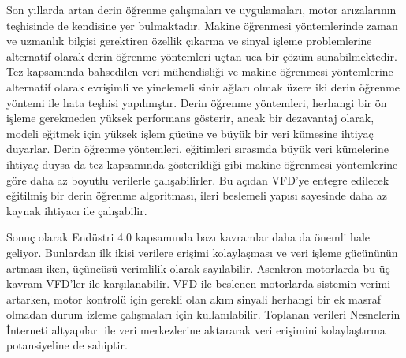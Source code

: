 Son yıllarda artan derin öğrenme çalışmaları ve uygulamaları, motor arızalarının teşhisinde de kendisine yer bulmaktadır. Makine öğrenmesi yöntemlerinde zaman ve uzmanlık bilgisi gerektiren özellik çıkarma ve sinyal işleme problemlerine alternatif olarak derin öğrenme yöntemleri uçtan uca bir çözüm sunabilmektedir. Tez kapsamında bahsedilen veri mühendisliği ve makine öğrenmesi yöntemlerine alternatif olarak evrişimli ve yinelemeli sinir ağları olmak üzere iki derin öğrenme yöntemi ile hata teşhisi yapılmıştır. Derin öğrenme yöntemleri, herhangi bir ön işleme gerekmeden yüksek performans gösterir, ancak bir dezavantaj olarak, modeli eğitmek için yüksek işlem gücüne ve büyük bir veri kümesine ihtiyaç duyarlar. Derin öğrenme yöntemleri, eğitimleri sırasında büyük veri kümelerine ihtiyaç duysa da tez kapsamında gösterildiği gibi makine öğrenmesi yöntemlerine göre daha az boyutlu verilerle çalışabilirler. Bu açıdan VFD'ye entegre edilecek eğitilmiş bir derin öğrenme algoritması, ileri beslemeli yapısı sayesinde daha az kaynak ihtiyacı ile çalışabilir.

Sonuç olarak Endüstri 4.0 kapsamında bazı kavramlar daha da önemli hale geliyor. Bunlardan ilk ikisi verilere erişimi kolaylaşması ve veri işleme gücününün artması iken, üçüncüsü verimlilik olarak sayılabilir. Asenkron motorlarda bu üç kavram VFD'ler ile karşılanabilir. VFD ile beslenen motorlarda sistemin verimi artarken, motor kontrolü için gerekli olan akım sinyali herhangi bir ek masraf olmadan durum izleme çalışmaları için kullanılabilir. Toplanan verileri Nesnelerin İnterneti altyapıları ile veri merkezlerine aktararak veri erişimini kolaylaştırma potansiyeline de sahiptir.
 
